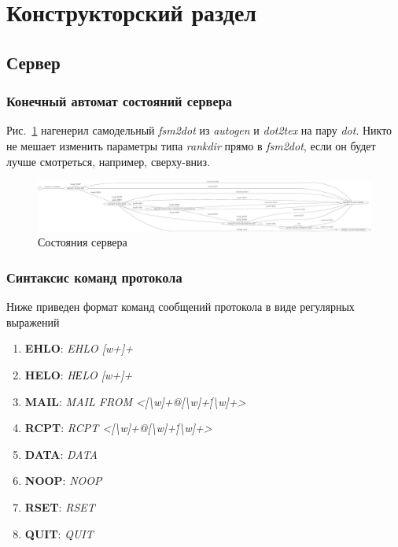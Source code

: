 \documentclass[a4paper,12pt]{report}
\begin{document}


\chapter*{Конструкторский раздел}

\section*{Сервер}

\subsection*{Конечный автомат состояний сервера}

Рис.~\ref{fig:server_fsm} нагенерил самодельный \textit{fsm2dot} из \textit{autogen} и \textit{dot2tex} на пару \textit{dot}. Никто не мешает изменить параметры типа \textit{rankdir} прямо в \textit{fsm2dot}, если он будет лучше смотреться, например, сверху-вниз.

\begin{figure}
\centering
\includegraphics[width=\textwidth]{static/server_dot.pdf}
\caption{Состояния сервера}
\label{fig:server_fsm}
\end{figure}

\subsection*{Синтаксис команд протокола}
Ниже приведен формат команд сообщений протокола в виде регулярных выражений
\begin{enumerate}
\item \textbf{EHLO}: {\it EHLO [w+]+\/}
\item \textbf{HELO}: {\it HЕLO [w+]+\/}
\item \textbf{MAIL}: {\it MAIL FROM <[\textbackslash w]+@[\textbackslash w]+\.[\textbackslash w]+>\/}
\item \textbf{RCPT}: {\it RCPT <[\textbackslash w]+@[\textbackslash w]+\.[\textbackslash w]+>\/}
\item \textbf{DATA}: {\it DATA\/}
\item \textbf{NOOP}: {\it NOOP\/}
\item \textbf{RSET}: {\it RSET\/}
\item \textbf{QUIT}: {\it QUIT\/}
\end{enumerate}
\end{document}
